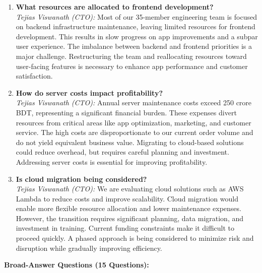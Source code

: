 \documentclass[12pt,a4paper]{article}
\begin{document}
\begin{enumerate}
        \item \textbf{What resources are allocated to frontend development?} \\
        \textit{Tejias Viswanath (CTO):} Most of our 35-member engineering team is focused on backend infrastructure maintenance, leaving limited resources for frontend development. This results in slow progress on app improvements and a subpar user experience. The imbalance between backend and frontend priorities is a major challenge. Restructuring the team and reallocating resources toward user-facing features is necessary to enhance app performance and customer satisfaction.

        \item \textbf{How do server costs impact profitability?} \\
        \textit{Tejias Viswanath (CTO):} Annual server maintenance costs exceed 250 crore BDT, representing a significant financial burden. These expenses divert resources from critical areas like app optimization, marketing, and customer service. The high costs are disproportionate to our current order volume and do not yield equivalent business value. Migrating to cloud-based solutions could reduce overhead, but requires careful planning and investment. Addressing server costs is essential for improving profitability.

        \item \textbf{Is cloud migration being considered?} \\
        \textit{Tejias Viswanath (CTO):} We are evaluating cloud solutions such as AWS Lambda to reduce costs and improve scalability. Cloud migration would enable more flexible resource allocation and lower maintenance expenses. However, the transition requires significant planning, data migration, and investment in training. Current funding constraints make it difficult to proceed quickly. A phased approach is being considered to minimize risk and disruption while gradually improving efficiency.
\end{enumerate}

\textbf{Broad-Answer Questions (15 Questions):}
\end{document}
